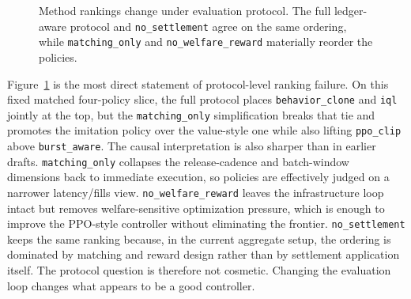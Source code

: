 \documentclass[11pt]{article}
\begin{document}
\begin{figure}[t]
\centering
{}
\caption{Method rankings change under evaluation protocol. The full ledger-aware protocol and \texttt{no\_settlement} agree on the same ordering, while \texttt{matching\_only} and \texttt{no\_welfare\_reward} materially reorder the policies.}
\label{fig:protocolranks}
\end{figure}

Figure~\ref{fig:protocolranks} is the most direct statement of protocol-level ranking failure. On this fixed matched four-policy slice, the full protocol places \texttt{behavior\_clone} and \texttt{iql} jointly at the top, but the \texttt{matching\_only} simplification breaks that tie and promotes the imitation policy over the value-style one while also lifting \texttt{ppo\_clip} above \texttt{burst\_aware}. The causal interpretation is also sharper than in earlier drafts. \texttt{matching\_only} collapses the release-cadence and batch-window dimensions back to immediate execution, so policies are effectively judged on a narrower latency/fills view. \texttt{no\_welfare\_reward} leaves the infrastructure loop intact but removes welfare-sensitive optimization pressure, which is enough to improve the PPO-style controller without eliminating the frontier. \texttt{no\_settlement} keeps the same ranking because, in the current aggregate setup, the ordering is dominated by matching and reward design rather than by settlement application itself. The protocol question is therefore not cosmetic. Changing the evaluation loop changes what appears to be a good controller.
\end{document}
